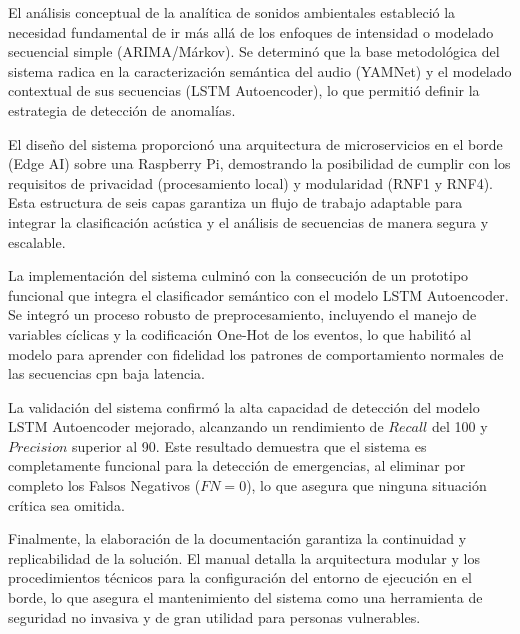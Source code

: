 
El análisis conceptual de la analítica de sonidos ambientales estableció la necesidad fundamental de ir más allá de los enfoques de intensidad o modelado secuencial simple (ARIMA/Márkov). Se determinó que la base metodológica del sistema radica en la caracterización semántica del audio (YAMNet) y el modelado contextual de sus secuencias (LSTM Autoencoder), lo que permitió definir la estrategia de detección de anomalías.

El diseño del sistema proporcionó una arquitectura de microservicios en el borde (Edge AI) sobre una Raspberry Pi, demostrando la posibilidad de cumplir con los requisitos de privacidad (procesamiento local) y modularidad (RNF1 y RNF4). Esta estructura de seis capas garantiza un flujo de trabajo adaptable para integrar la clasificación acústica y el análisis de secuencias de manera segura y escalable.

La implementación del sistema culminó con la consecución de un prototipo funcional que integra el clasificador semántico con el modelo LSTM Autoencoder. Se integró un proceso robusto de preprocesamiento, incluyendo el manejo de variables cíclicas y la codificación One-Hot de los eventos, lo que habilitó al modelo para aprender con fidelidad los patrones de comportamiento normales de las secuencias cpn baja latencia.

La validación   del sistema confirmó la alta capacidad de detección del modelo LSTM Autoencoder mejorado, alcanzando un rendimiento de $Recall$ del 100 y $Precision$ superior al 90. Este resultado demuestra que el sistema es completamente funcional para la detección de emergencias, al eliminar por completo los Falsos Negativos ($FN=0$), lo que asegura que ninguna situación crítica sea omitida.

Finalmente, la elaboración de la documentación garantiza la continuidad y replicabilidad de la solución. El manual detalla la arquitectura modular y los procedimientos técnicos para la configuración del entorno de ejecución en el borde, lo que asegura el mantenimiento del sistema como una herramienta de seguridad no invasiva y de gran utilidad para personas vulnerables.
 

